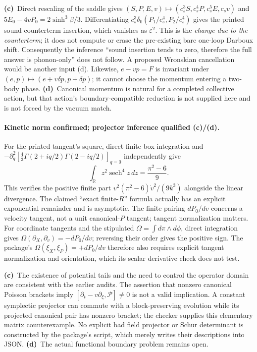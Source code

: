 \documentclass[11pt,a4paper]{article}
\newcommand{\Lc}{\textbf{(c)}\ }
\newcommand{\Ld}{\textbf{(d)}\ }
\begin{document}
\Lc Direct rescaling of the saddle gives $(S,P,E,v)\mapsto
(c_s^3S,c_s^4P,c_s^5E,c_sv)$ and
$5E_0-4vP_0=2\sinh^3\beta/3$.
Differentiating $c_s^3\delta_0(P_1/c_s^4,P_2/c_s^4)$ gives the printed
sound counterterm insertion, which vanishes as $\varepsilon^2$.
This is the \emph{change due to the counterterm}; it does not compute or erase
the pre-existing bare one-loop Darboux shift. Consequently the inference
``sound insertion tends to zero, therefore the full answer is phonon-only''
does not follow. A proposed Wronskian cancellation would be another input (d).
Likewise, $e-vp=F$ is invariant under $(e,p)\mapsto(e+v\delta p,p+\delta p)$;
it cannot choose the momentum entering a two-body phase.
\Ld Canonical momentum is natural for a completed collective action, but
that action's boundary-compatible reduction is not supplied here and is not
forced by the vacuum match.

\paragraph{Kinetic norm confirmed; projector inference qualified (c)/(d).}
For the printed tangent's square, direct finite-box integration and
$-\partial_q^2[\frac43\Gamma(2+iq/2)\Gamma(2-iq/2)]_{q=0}$ independently give
\[
 \int_{\mathbb R}z^2\operatorname{sech}^4z\,dz=\frac{\pi^2-6}{9}.
\]
This verifies the positive finite part
$v^2(\pi^2-6)\dot v^2/(9k^3)$ alongside the linear divergence.
The claimed ``exact finite-$R$'' formula actually has an explicit exponential
remainder and is asymptotic. The finite pairing $dP_0/dv$ concerns a velocity
tangent, not a unit canonical-$P$ tangent; tangent normalization matters.
For coordinate tangents and the stipulated $\Omega=\int d\pi\wedge d\phi$,
direct integration gives $\Omega(\partial_X,\partial_v)=-dP_0/dv$;
reversing their order gives the positive sign. The package's
$\Omega(\xi_X,\xi_P)=+dP_0/dv$ therefore also requires explicit tangent
normalization and orientation, which its scalar derivative check does not test.

\Lc The existence of potential tails and the need to control the operator
domain are consistent with the earlier audits. The assertion that nonzero
canonical Poisson brackets imply $[\partial_t-v\partial_\xi,\mathcal P]\ne0$
is not a valid implication. A constant symplectic projector can commute with
a block-preserving evolution while its projected canonical pair has nonzero
bracket; the checker supplies this elementary matrix counterexample.
No explicit bad field projector or Schur determinant is constructed by the
package's script, which merely writes their descriptions into JSON.
\Ld The actual functional boundary problem remains open.
\end{document}
